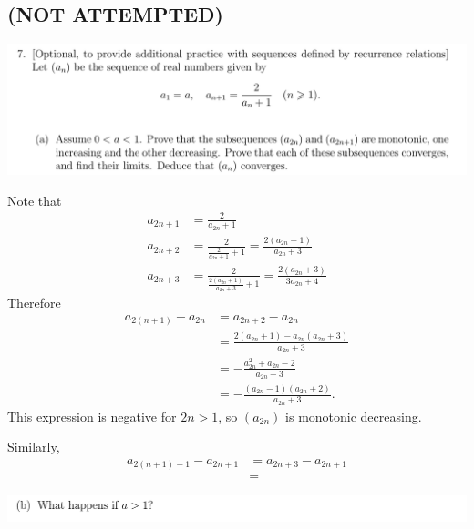 \documentclass[12pt]{article}
\begin{document}
\subsection{(NOT ATTEMPTED)}
\begin{mdframed}
\includegraphics[width=400pt]{img/oxford-M2-analysis-I-4-7-a.png}
\end{mdframed}
Note that
\begin{align*}
  a_{2n + 1} &= \frac{2}{a_{2n} + 1}\\
  a_{2n + 2} &= \frac{2}{\frac{2}{a_{2n} + 1} + 1}
             = \frac{2(a_{2n} + 1)}{a_{2n} + 3}\\
  a_{2n + 3} &= \frac{2}{\frac{2(a_{2n} + 1)}{a_{2n} + 3} + 1}
             = \frac{2(a_{2n} + 3)}{3a_{2n} + 4}
\end{align*}
Therefore
\begin{align*}
  a_{2(n+1)} - a_{2n}
  & = a_{2n + 2} - a_{2n}\\
  & = \frac{2(a_{2n} + 1) - a_{2n}(a_{2n} + 3)}{a_{2n} + 3}\\
  &= -\frac{a_{2n}^2 + a_{2n} - 2}{a_{2n} + 3}\\
  &= -\frac{(a_{2n} - 1)(a_{2n} + 2)}{a_{2n} + 3}.
\end{align*}
This expression is negative for $2n > 1$, so $(a_{2n})$ is monotonic decreasing.

Similarly,
\begin{align*}
  a_{2(n+1) + 1} - a_{2n + 1}
  &= a_{2n + 3} - a_{2n + 1}\\
  &=
\end{align*}



\begin{mdframed}
\includegraphics[width=400pt]{img/oxford-M2-analysis-I-4-7-b.png}
\end{mdframed}

\newpage
\end{document}
